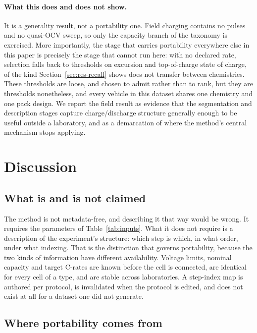 \documentclass[preprint,3p,number]{elsarticle}
\begin{document}
\paragraph{What this does and does not show.} It is a generality result, not a
portability one. Field charging contains no pulses and no quasi-OCV sweep, so
only the capacity branch of the taxonomy is exercised. More importantly, the
stage that carries portability everywhere else in this paper is precisely the
stage that cannot run here: with no declared rate, selection falls back to
thresholds on excursion and top-of-charge state of charge, of the kind
Section~\ref{sec:res-recall} shows does not transfer between chemistries. These
thresholds are loose, and chosen to admit rather than to rank, but they are
thresholds nonetheless, and every vehicle in this dataset shares one chemistry
and one pack design. We report the field result as evidence that the
segmentation and description stages capture charge/discharge structure generally
enough to be useful outside a laboratory, and as a demarcation of where the
method's central mechanism stops applying.

\section{Discussion}
\label{sec:discussion}

\subsection{What is and is not claimed}

The method is not metadata-free, and describing it that way would be wrong. It
requires the parameters of Table~\ref{tab:inputs}. What it does not require is a
description of the experiment's structure: which step is which, in what order,
under what indexing. That is the distinction that governs portability, because
the two kinds of information have different availability. Voltage limits,
nominal capacity and target C-rates are known before the cell is connected, are
identical for every cell of a type, and are stable across laboratories. A
step-index map is authored per protocol, is invalidated when the protocol is
edited, and does not exist at all for a dataset one did not generate.

\subsection{Where portability comes from}
\end{document}

